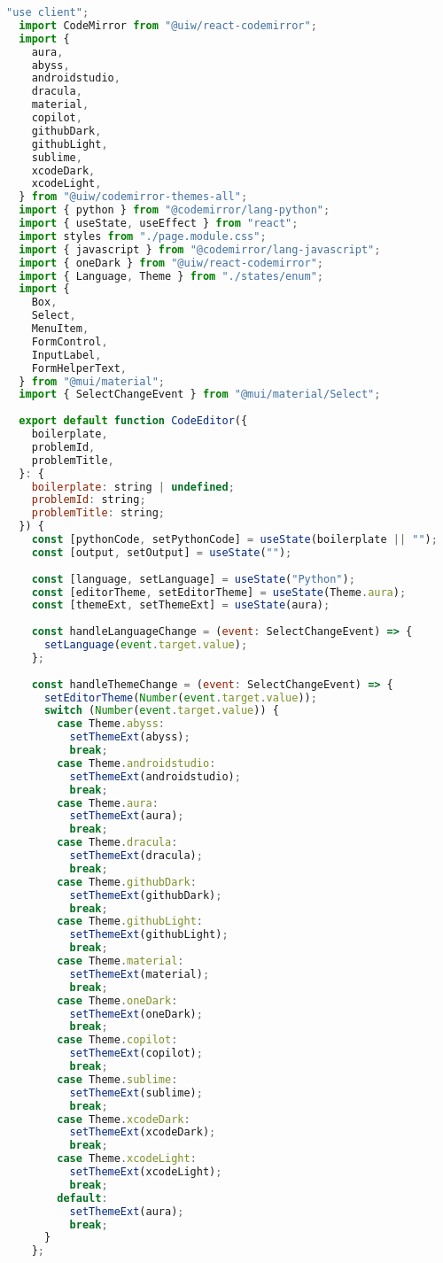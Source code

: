 \begin{lstlisting}[language=JavaScript, frame=single, caption={Codemirror буюу @uiw/react-codemirror-ийн компонентийг ашиглаж буй байдал}]
  "use client";
  import CodeMirror from "@uiw/react-codemirror";
  import {
    aura,
    abyss,
    androidstudio,
    dracula,
    material,
    copilot,
    githubDark,
    githubLight,
    sublime,
    xcodeDark,
    xcodeLight,
  } from "@uiw/codemirror-themes-all";
  import { python } from "@codemirror/lang-python";
  import { useState, useEffect } from "react";
  import styles from "./page.module.css";
  import { javascript } from "@codemirror/lang-javascript";
  import { oneDark } from "@uiw/react-codemirror";
  import { Language, Theme } from "./states/enum";
  import {
    Box,
    Select,
    MenuItem,
    FormControl,
    InputLabel,
    FormHelperText,
  } from "@mui/material";
  import { SelectChangeEvent } from "@mui/material/Select";
  
  export default function CodeEditor({
    boilerplate,
    problemId,
    problemTitle,
  }: {
    boilerplate: string | undefined;
    problemId: string;
    problemTitle: string;
  }) {
    const [pythonCode, setPythonCode] = useState(boilerplate || "");
    const [output, setOutput] = useState("");
  
    const [language, setLanguage] = useState("Python");
    const [editorTheme, setEditorTheme] = useState(Theme.aura);
    const [themeExt, setThemeExt] = useState(aura);
  
    const handleLanguageChange = (event: SelectChangeEvent) => {
      setLanguage(event.target.value);
    };
  
    const handleThemeChange = (event: SelectChangeEvent) => {
      setEditorTheme(Number(event.target.value));
      switch (Number(event.target.value)) {
        case Theme.abyss:
          setThemeExt(abyss);
          break;
        case Theme.androidstudio:
          setThemeExt(androidstudio);
          break;
        case Theme.aura:
          setThemeExt(aura);
          break;
        case Theme.dracula:
          setThemeExt(dracula);
          break;
        case Theme.githubDark:
          setThemeExt(githubDark);
          break;
        case Theme.githubLight:
          setThemeExt(githubLight);
          break;
        case Theme.material:
          setThemeExt(material);
          break;
        case Theme.oneDark:
          setThemeExt(oneDark);
          break;
        case Theme.copilot:
          setThemeExt(copilot);
          break;
        case Theme.sublime:
          setThemeExt(sublime);
          break;
        case Theme.xcodeDark:
          setThemeExt(xcodeDark);
          break;
        case Theme.xcodeLight:
          setThemeExt(xcodeLight);
          break;
        default:
          setThemeExt(aura);
          break;
      }
    };
  

\end{lstlisting}
